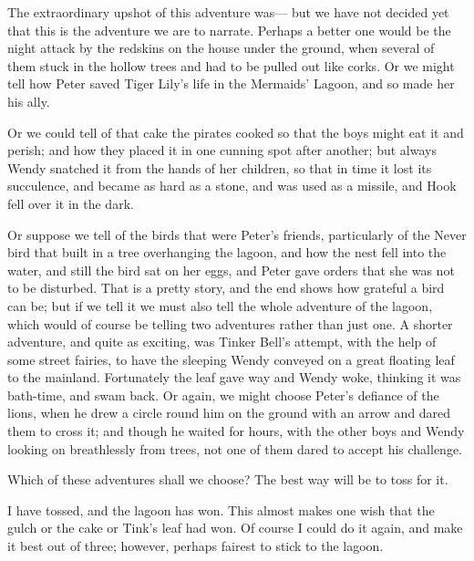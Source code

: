 The extraordinary upshot of this adventure was—%
but we have not decided yet that this is the adventure we are to narrate.
Perhaps a better one would be the night attack by the redskins on the house under the ground,
when several of them stuck in the hollow trees and had to be pulled out like corks.
Or we might tell how Peter saved Tiger Lily’s life in the Mermaids’ Lagoon, and so made her his ally.

Or we could tell of that cake the pirates cooked so that the boys might eat it and perish;
and how they placed it in one cunning spot after another;
but always Wendy snatched it from the hands of her children,
so that in time it lost its succulence, and became as hard as a stone, and was used as a missile,
and Hook fell over it in the dark.

Or suppose we tell of the birds that were Peter’s friends,
particularly of the Never bird that built in a tree overhanging the lagoon,
and how the nest fell into the water, and still the bird sat on her eggs,
and Peter gave orders that she was not to be disturbed.
That is a pretty story, and the end shows how grateful a bird can be;
but if we tell it we must also tell the whole adventure of the lagoon,
which would of course be telling two adventures rather than just one.
A shorter adventure, and quite as exciting, was Tinker Bell’s attempt, with the help of some street fairies,
to have the sleeping Wendy conveyed on a great floating leaf to the mainland.
Fortunately the leaf gave way and Wendy woke, thinking it was bath-time, and swam back.
Or again, we might choose Peter’s defiance of the lions,
when he drew a circle round him on the ground with an arrow and dared them to cross it;
and though he waited for hours, with the other boys and Wendy looking on breathlessly from trees,
not one of them dared to accept his challenge.

Which of these adventures shall we choose?
The best way will be to toss for it.

I have tossed, and the lagoon has won.
This almost makes one wish that the gulch or the cake or Tink’s leaf had won.
Of course I could do it again, and make it best out of three;
however, perhaps fairest to stick to the lagoon.

\endinput
